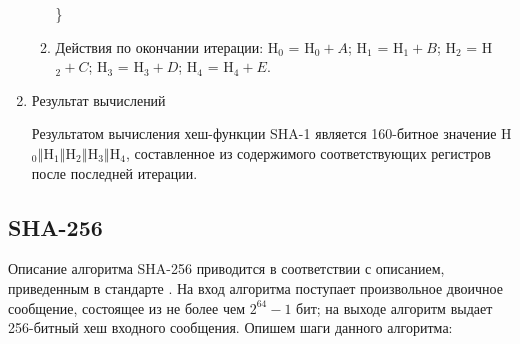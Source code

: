 \documentclass{./civarticle}
\begin{document}
\begin{enumerate}
\begin{enumerate}
        \}
        \item Действия по окончании итерации: H$_0$ = H$_0 + A$; H$_1$ = H$_1 + B$; H$_2$ = H$_2 + C$; H$_3$ = H$_3 + D$; H$_4$ = H$_4 + E$.  
    \end{enumerate}

    \item Результат вычислений

    Результатом вычисления хеш-функции SHA-1 является 160-битное значение H$_0\mathbin\Vert$H$_1\mathbin\Vert$H$_2\mathbin\Vert$H$_3\mathbin\Vert$H$_4$, составленное из содержимого соответствующих регистров после последней итерации.
    
\end{enumerate}

\subsection{SHA-256}

Описание алгоритма SHA-256 приводится в соответствии с описанием, приведенным в стандарте \cite{sha256}. На вход алгоритма поступает произвольное двоичное сообщение, состоящее из не более чем $2^{64} - 1$ бит; на выходе алгоритм выдает 256-битный хеш входного сообщения. Опишем шаги данного алгоритма:
\end{document}

